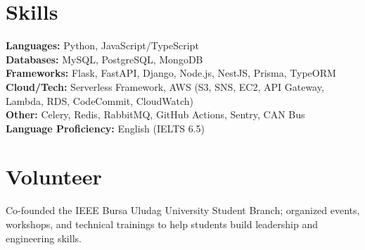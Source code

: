 \documentclass[10pt,a4paper]{extarticle}
\begin{document}
\section{Skills}
\textbf{Languages:} Python, JavaScript/TypeScript\\
\textbf{Databases:} MySQL, PostgreSQL, MongoDB\\
\textbf{Frameworks:} Flask, FastAPI, Django, Node.js, NestJS, Prisma, TypeORM\\
\textbf{Cloud/Tech:} Serverless Framework, AWS (S3, SNS, EC2, API Gateway, Lambda, RDS, CodeCommit, CloudWatch)\\
\textbf{Other:} Celery, Redis, RabbitMQ, GitHub Actions, Sentry, CAN Bus\\
\textbf{Language Proficiency:} English (IELTS 6.5)

\section{Volunteer}
Co-founded the IEEE Bursa Uludag University Student Branch; organized events, workshops, and technical trainings to help students build leadership and engineering skills.
\end{document}
